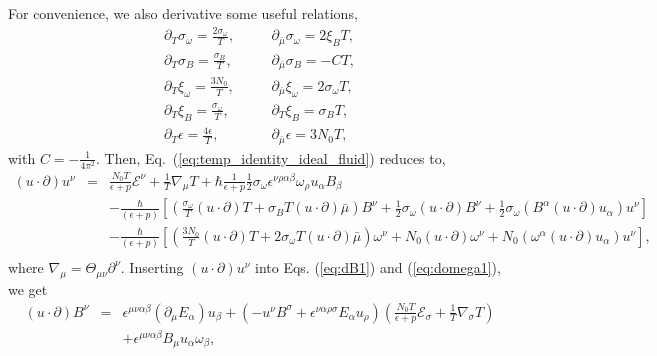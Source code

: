 \documentclass[aps,prd,showkeys,preprint,amsmath,amssymb,nofootinbib]{revtex4-1}
\begin{document}
For convenience, we also derivative some useful relations, 
\begin{eqnarray}
\partial_{T}\sigma_{\omega}=\frac{2\sigma_{\omega}}{T}, & \quad & \partial_{\bar{\mu}}\sigma_{\omega}=2\xi_{B}T,\nonumber \\
\partial_{T}\sigma_{B}=\frac{\sigma_{B}}{T}, & \quad & \partial_{\bar{\mu}}\sigma_{B}=-CT,\nonumber \\
\partial_{T}\xi_{\omega}=\frac{3N_{0}}{T}, & \quad & \partial_{\bar{\mu}}\xi_{\omega}=2\sigma_{\omega}T,\nonumber \\
\partial_{T}\xi_{B}=\frac{\sigma_{\omega}}{T}, & \quad & \partial_{T}\xi_{B}=\sigma_{B}T,\nonumber \\
\partial_{T}\epsilon=\frac{4\epsilon}{T}, & \quad & \partial_{\bar{\mu}}\epsilon=3N_{0}T,
\end{eqnarray}
with $C=-\frac{1}{4\pi^{2}}$. Then, Eq.~(\ref{eq:temp_identity_ideal_fluid})
reduces to,
\begin{eqnarray}
(u\cdot\partial)u^{\nu} & = & \frac{N_{0}T}{\epsilon+p}
\mathcal{E}^{\nu}+\frac{1}{T}\nabla_{\mu}T+\hbar\frac{1}{\epsilon+p}{\frac{1}{2}}\sigma_{\omega}\epsilon^{\nu\rho\alpha\beta}\omega_{\rho}u_{\alpha}B_{\beta}\nonumber \\
 &  & -\frac{\hbar}{(\epsilon+p)}\left[\left(\frac{\sigma_{\omega}}{T}(u\cdot\partial)T
+\sigma_{B}T(u\cdot\partial)\bar{\mu}\right)B^{\nu}+\frac{1}{2}\sigma_{\omega}(u\cdot\partial)B^{\nu}+\frac{1}{2}\sigma_{\omega}(B^{\alpha}(u\cdot\partial)u_{\alpha})u^{\nu}\right]\nonumber \\\nonumber
 &  & -\frac{\hbar}{(\epsilon+p)}\left[\left(\frac{3N_{0}}{T}(u\cdot\partial)T+2\sigma_{\omega}T(u\cdot\partial)\bar{\mu}\right)\omega^{\nu}+N_{0}(u\cdot\partial)\omega^{\nu}+N_{0}(\omega^{\alpha}(u\cdot\partial)u_{\alpha})u^{\nu}\right],
 \\\label{eq:Du_1}
\end{eqnarray}
where $\nabla_{\mu}=\Theta_{\mu\nu}\partial^{\nu}$. Inserting $(u\cdot\partial)u^{\nu}$
into Eqs. (\ref{eq:dB1}) and (\ref{eq:domega1}), we get
\begin{eqnarray}
(u\cdot\partial)B^{\nu} & = & \epsilon^{\mu\nu\alpha\beta}(\partial_{\mu}E_{\alpha})u_{\beta}+(-u^{\nu}B^{\sigma}+\epsilon^{\nu\alpha\rho\sigma}E_{\alpha}u_{\rho})\left(\frac{N_{0}T}{\epsilon+p}\mathcal{E}_{\sigma}+\frac{1}{T}\nabla_{\sigma}T\right)\nonumber \\
 &  & +\epsilon^{\mu\nu\alpha\beta}B_{\mu}u_{\alpha}\omega_{\beta},\label{eq:DB_1}
\end{eqnarray}
\end{document}
